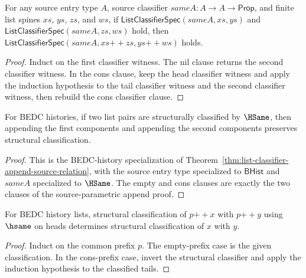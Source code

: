 \begin{theorem}
\label{thm:list-classifier-append-source-relation}
For any source entry type $A$, source classifier $sameA:A\to A\to\mathsf{Prop}$,
and finite list spines $xs$, $ys$, $zs$, and $ws$, if
$\mathsf{ListClassifierSpec}(sameA,xs,ys)$ and
$\mathsf{ListClassifierSpec}(sameA,zs,ws)$ hold, then
$\mathsf{ListClassifierSpec}(sameA,xs{++}zs,ys{++}ws)$ holds.
\end{theorem}
\begin{proof}
Induct on the first classifier witness. The nil clause returns the second
classifier witness. In the cons clause, keep the head classifier witness and
apply the induction hypothesis to the tail classifier witness and the second
classifier witness, then rebuild the cons classifier clause.
\end{proof}

\begin{theorem}
\label{thm:list-classifier-append-hsame}
For BEDC histories, if two list pairs are structurally classified by \(\HSame\),
then appending the first components and appending the second components
preserves structural classification.
\end{theorem}

\begin{proof}
This is the BEDC-history specialization of
Theorem~\ref{thm:list-classifier-append-source-relation}, with the source
entry type specialized to $\mathsf{BHist}$ and $sameA$ specialized to
$\HSame$. The empty and cons clauses are exactly the two clauses of the
source-parametric append proof.
\end{proof}

\begin{theorem}
\label{thm:list-classifier-hsame-append-left-cancel}
For BEDC history lists, structural classification of \(p{++}x\) with
\(p{++}y\) using \(\hsame\) on heads determines structural classification of
\(x\) with \(y\).
\end{theorem}

\begin{proof}
Induct on the common prefix \(p\). The empty-prefix case is the given
classification. In the cons-prefix case, invert the structural classifier and
apply the induction hypothesis to the classified tails.
\end{proof}

